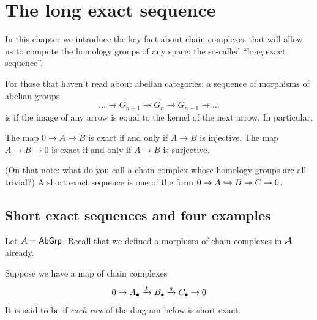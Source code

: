 \chapter{The long exact sequence}
\label{ch:long_exact_sequence}
In this chapter we introduce the key fact about chain complexes that will allow us to compute
the homology groups of any space: the so-called ``long exact sequence''.

For those that haven't read about abelian categories:
a sequence of morphisms of abelian groups
\[ \dots \to G_{n+1} \to G_n \to G_{n-1} \to \dots \]
is  if the image of any arrow is equal to the kernel of the next arrow.
In particular,
\begin{itemize}
	\ii The map $0 \to A \to B$ is exact if and only if $A \to B$ is injective.
	\ii The map $A \to B \to 0$ is exact if and only if $A \to B$ is surjective.
\end{itemize}
(On that note: what do you call a chain complex whose homology groups are all trivial?)
A short exact sequence is one of the form $0 \to A \injto B \surjto C \to 0$.

\section{Short exact sequences and four examples}
Let $\AA = \catname{AbGrp}$.
Recall that we defined a morphism of chain complexes in $\AA$ already.
\begin{definition}
Suppose we have a map of chain complexes
\[ 0 \to A_\bullet \taking f B_\bullet \taking g C_\bullet \to 0 \]
It is said to be  if \emph{each row} of the diagram below is short exact.
\begin{center}
\end{center}
\end{definition}

